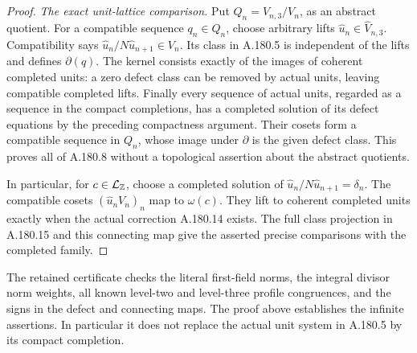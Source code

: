 \begin{proof}
\emph{The exact unit-lattice comparison.}
Put \(Q_n=\widehat V_{n,3}/V_n\), as an abstract quotient.
For a compatible sequence \(q_n\in Q_n\), choose arbitrary
lifts \(\widehat u_n\in\widehat V_{n,3}\).
Compatibility says
\(\widehat u_n/N\widehat u_{n+1}\in V_n\).
Its class in A.180.5 is independent of the lifts and defines
\(\partial(q)\).  The kernel consists exactly of the images
of coherent completed units: a zero defect class can be removed
by actual units, leaving compatible completed lifts.
Finally every sequence of actual units, regarded as a sequence
in the compact completions, has a completed solution of its
defect equations by the preceding compactness argument.
Their cosets form a compatible sequence in \(Q_n\), whose
image under \(\partial\) is the given defect class.
This proves all of A.180.8 without a topological assertion
about the abstract quotients.

In particular, for \(c\in\mathcal L_{\mathbb Z}\), choose a
completed solution of
\(\widehat u_n/N\widehat u_{n+1}=\delta_n\).
The compatible cosets \((\widehat u_nV_n)_n\) map to
\(\omega(c)\).  They lift to coherent completed units exactly
when the actual correction A.180.14 exists.
The full class projection in A.180.15 and this connecting map
give the asserted precise comparisons with the completed family.
\end{proof}

The retained certificate
checks the literal first-field norms, the integral divisor norm
weights, all known level-two and level-three profile congruences,
and the signs in the defect and connecting maps.  The proof above
establishes the infinite assertions.  In particular it does not
replace the actual unit system in A.180.5 by its compact completion.
